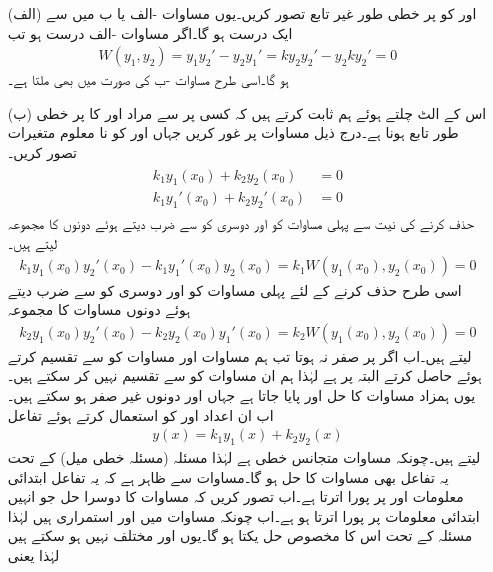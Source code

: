 \begin{enumerate}
\item[(الف)]
 اور  کو  پر خطی طور غیر تابع تصور کریں۔یوں مساوات -الف یا ب میں سے ایک درست ہو گا۔اگر  مساوات -الف  درست ہو تب
\begin{align*}
W(y_1,y_2)=y_1y_2'-y_2y_1'=ky_2y_2'-y_2ky_2'=0
\end{align*}
ہو گا۔اسی طرح مساوات -ب کی صورت میں بھی  ملتا ہے۔
\item[(ب)]
 اس کے الٹ چلتے ہوئے ہم ثابت کرتے ہیں کہ کسی  پر  سے مراد  اور  کا  پر خطی طور تابع ہونا ہے۔درج ذیل مساوات پر غور کریں جہاں  اور  کو نا معلوم متغیرات تصور کریں۔
\begin{gather}
\begin{aligned}\label{مساوات_سادہ_دو_درجی_ثبوت_الف}
k_1y_1(x_0)+k_2y_2(x_0)&=0\\
k_1y_1'(x_0)+k_2y_2'(x_0)&=0
\end{aligned}
\end{gather}
 حذف کرنے کی نیت سے  پہلی مساوات کو  اور دوسری کو  سے ضرب دیتے ہوئے دونوں کا مجموعہ لیتے ہیں۔
\begin{align}\label{مساوات_سادہ_دو_درجی_ثبوت_ب}
k_1y_1(x_0)y_2'(x_0)-k_1y_1'(x_0)y_2(x_0)=k_1W(y_1(x_0),y_2(x_0))=0
\end{align}
اسی طرح  حذف کرنے کے لئے پہلی مساوات کو  اور دوسری کو  سے ضرب دیتے ہوئے دونوں مساوات کا مجموعہ
\begin{align}\label{مساوات_سادہ_دو_درجی_ثبوت_پ}
k_2y_1(x_0)y_2'(x_0)-k_2y_2(x_0)y_1'(x_0)=k_2W(y_1(x_0),y_2(x_0))=0
\end{align}
لیتے ہیں۔اب اگر  پر  صفر نہ ہوتا تب ہم مساوات  اور مساوات  کو  سے تقسیم کرتے ہوئے  حاصل کرتے البتہ  پر  ہے لہٰذا ہم ان مساوات کو  سے  تقسیم نہیں کر سکتے ہیں۔ یوں  ہمزاد مساوات  کا حل  اور  پایا جاتا ہے جہاں  اور  دونوں غیر صفر ہو سکتے ہیں۔ اب ان اعداد  اور  کو استعمال کرتے ہوئے تفاعل
\begin{align}
y(x)=k_1y_1(x)+k_2y_2(x)
\end{align}
لیتے ہیں۔چونکہ مساوات  متجانس خطی ہے لہٰذا  مسئلہ   (مسئلہ خطی میل) کے تحت  یہ تفاعل بھی مساوات  کا حل ہو گا۔مساوات  سے ظاہر ہے کہ یہ تفاعل ابتدائی معلومات  اور  پر پورا اترتا ہے۔اب تصور کریں کہ مساوات  کا دوسرا حل جو انہیں  ابتدائی معلومات پر پورا اترتا ہو  ہے۔اب چونکہ مساوات  میں  اور  استمراری ہیں لہٰذا مسئلہ  کے تحت اس کا مخصوص حل یکتا ہو گا۔یوں  اور  مختلف نہیں ہو سکتے ہیں لہٰذا  یعنی

\end{enumerate}
